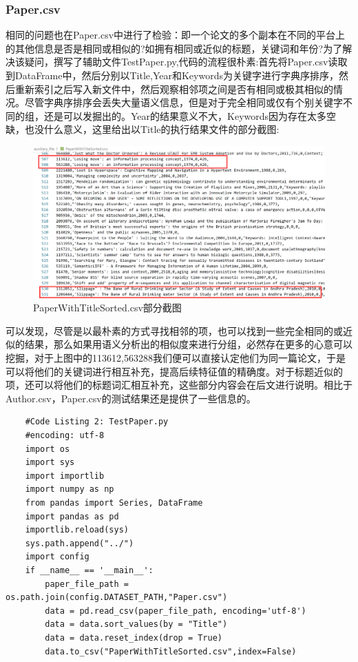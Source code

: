 \documentclass{mcmthesis}
\begin{document}
		\subsubsection{Paper.csv}
		\par 相同的问题也在Paper.csv中进行了检验：即一个论文的多个副本在不同的平台上的其他信息是否是相同或相似的?如拥有相同或近似的标题，关键词和年份?为了解决该疑问，撰写了辅助文件TestPaper.py,代码的流程很朴素:首先将Paper.csv读取到DataFrame中，然后分别以Title,Year和Keywords为关键字进行字典序排序，然后重新索引之后写入新文件中，然后观察相邻项之间是否有相同或极其相似的情况。尽管字典序排序会丢失大量语义信息，但是对于完全相同或仅有个别关键字不同的组，还是可以发掘出的。Year的结果意义不大，Keywords因为存在太多空缺，也没什么意义，这里给出以Title的执行结果文件的部分截图:
			\begin{figure}[h]
			\centering
			\includegraphics[width=0.8\linewidth]{p2.png}
			\caption{PaperWithTitleSorted.csv部分截图}
			\label{fig:p2}
			\end{figure}
		\par 可以发现，尽管是以最朴素的方式寻找相邻的项，也可以找到一些完全相同的或近似的结果，那么如果用语义分析出的相似度来进行分组，必然存在更多的心意可以挖掘，对于上图中的113612,563288我们便可以直接认定他们为同一篇论文，于是可以将他们的关键词进行相互补充，提高后续特征值的精确度。对于标题近似的项，还可以将他们的标题词汇相互补充，这些部分内容会在后文进行说明。相比于Author.csv，Paper.csv的测试结果还是提供了一些信息的。
	
		{\setmainfont{Courier New Bold}              
			\begin{lstlisting}
	#Code Listing 2: TestPaper.py
	#encoding: utf-8
	import os
	import sys
	import importlib
	import numpy as np
	from pandas import Series, DataFrame
	import pandas as pd
	importlib.reload(sys)
	sys.path.append("../")
	import config
	if __name__ == '__main__':
		paper_file_path = os.path.join(config.DATASET_PATH,"Paper.csv")
		data = pd.read_csv(paper_file_path, encoding='utf-8')
		data = data.sort_values(by = "Title")
		data = data.reset_index(drop = True)
		data.to_csv("PaperWithTitleSorted.csv",index=False)
			\end{lstlisting}
		}
\end{document}
